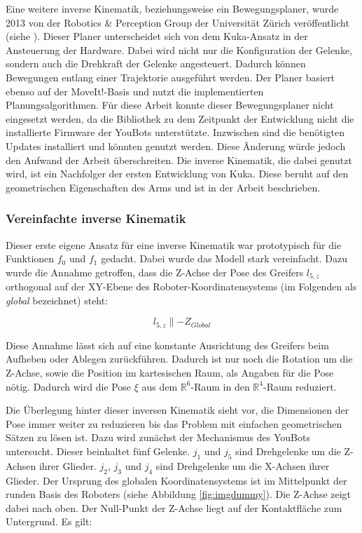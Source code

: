 Eine weitere inverse Kinematik, beziehungsweise ein Bewegungsplaner, wurde 2013 von der Robotics \& Perception Group der Universität Zürich veröffentlicht (siehe \cite{muggler2013torque}). Dieser Planer unterscheidet sich von dem Kuka-Ansatz in der Ansteuerung der Hardware. Dabei wird nicht nur die Konfiguration der Gelenke, sondern auch die  Drehkraft der Gelenke angesteuert. Dadurch können Bewegungen entlang einer Trajektorie ausgeführt werden. Der Planer basiert ebenso auf der MoveIt!-Basis und nutzt die implementierten Planungsalgorithmen. Für diese Arbeit konnte dieser Bewegungsplaner nicht eingesetzt werden, da die Bibliothek zu dem Zeitpunkt der Entwicklung nicht die installierte Firmware der YouBots unterstützte. Inzwischen sind die benötigten Updates installiert und könnten genutzt werden. Diese Änderung würde jedoch den Aufwand der Arbeit überschreiten. Die inverse Kinematik, die dabei genutzt wird, ist ein Nachfolger der ersten Entwicklung von Kuka. Diese beruht auf den geometrischen Eigenschaften des Arms und ist in der Arbeit \cite{6309496} beschrieben.

\subsubsection{Vereinfachte inverse Kinematik}
Dieser erste eigene Ansatz für eine inverse Kinematik war prototypisch für die Funktionen $f_0$ und $f_1$ gedacht. Dabei wurde das Modell stark vereinfacht. Dazu wurde die Annahme getroffen, dass die Z-Achse der Pose des Greifers $l_{5,z}$ orthogonal auf der XY-Ebene des Roboter-Koordinatensystems (im Folgenden als \textit{global} bezeichnet) steht:

\begin{equation}
l_{5,z} \parallel -Z_{Global}
\label{eq:1}
\end{equation}


Diese Annahme lässt sich auf eine konstante Ausrichtung des Greifers beim Aufheben oder Ablegen zurückführen. Dadurch ist nur noch die Rotation um die Z-Achse, sowie die Position im kartesischen Raum, als Angaben für die Pose nötig. Dadurch wird die Pose $\xi$ aus dem $ \mathbb{R}^6 $-Raum in den $ \mathbb{R}^4 $-Raum reduziert.

Die Überlegung hinter dieser inversen Kinematik sieht vor, die Dimensionen der Pose immer weiter zu reduzieren bis das Problem mit einfachen geometrischen Sätzen zu lösen ist. Dazu wird zunächst der Mechanismus des YouBots untersucht. Dieser beinhaltet fünf Gelenke. $j_1$ und $j_5$ sind Drehgelenke um die Z-Achsen ihrer Glieder. $j_2$, $j_3$ und $j_4$ sind Drehgelenke um die X-Achsen ihrer Glieder. Der Ursprung des globalen Koordinatensystems ist im Mittelpunkt der runden Basis des Roboters (siehe Abbildung \ref{fig:imgdummy}). Die Z-Achse zeigt dabei nach oben. Der Null-Punkt der Z-Achse liegt auf der Kontaktfläche zum Untergrund. Es gilt:

